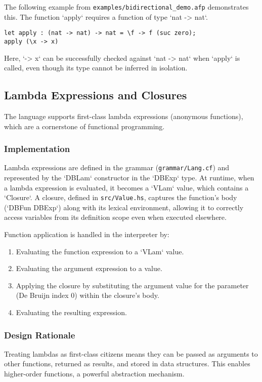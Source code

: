 The following example from \texttt{examples/bidirectional\_demo.afp} demonstrates this. The function `apply` requires a function of type `nat -> nat`.
\begin{verbatim}
let apply : (nat -> nat) -> nat = \f -> f (suc zero);
apply (\x -> x)
\end{verbatim}
Here, `\x -> x` can be successfully checked against `nat -> nat` when `apply` is called, even though its type cannot be inferred in isolation.

\subsection{Lambda Expressions and Closures}

The language supports first-class lambda expressions (anonymous functions), which are a cornerstone of functional programming.

\subsubsection{Implementation}
Lambda expressions are defined in the grammar (\texttt{grammar/Lang.cf}) and represented by the `DBLam` constructor in the `DBExp` type. At runtime, when a lambda expression is evaluated, it becomes a `VLam` value, which contains a `Closure`. A closure, defined in \texttt{src/Value.hs}, captures the function's body (`DBFun DBExp`) along with its lexical environment, allowing it to correctly access variables from its definition scope even when executed elsewhere.

Function application is handled in the interpreter by:
\begin{enumerate}
    \item Evaluating the function expression to a `VLam` value.
    \item Evaluating the argument expression to a value.
    \item Applying the closure by substituting the argument value for the parameter (De Bruijn index 0) within the closure's body.
    \item Evaluating the resulting expression.
\end{enumerate}

\subsubsection{Design Rationale}
Treating lambdas as first-class citizens means they can be passed as arguments to other functions, returned as results, and stored in data structures. This enables higher-order functions, a powerful abstraction mechanism.

